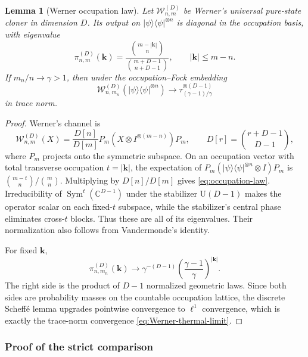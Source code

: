 \documentclass[11pt]{article}
\newtheorem{lemma}[lemma]{Lemma}
\theoremstyle{remark}
\theoremstyle{plain}
\newcommand{\C}{\mathbb C}
\newcommand{\U}{\mathrm U}
\newcommand{\proj}[1]{|#1\rangle\!\langle #1|}
\newcommand{\ot}{\otimes}
\begin{document}
\begin{lemma}[Werner occupation law]
\label{lem:Werner-Fock}
Let \(\mathcal W_{n,m}^{(D)}\) be Werner's universal pure-state cloner in
dimension \(D\).  Its output on \(\proj\psi^{\ot n}\) is diagonal in the
occupation basis, with eigenvalue
\begin{equation}\label{eq:occupation-law}
  \pi_{n,m}^{(D)}(\mathbf k)
  =\frac{\binom{m-|\mathbf k|}{n}}
         {\binom{m+D-1}{n+D-1}},
  \qquad |\mathbf k|\le m-n.
\end{equation}
If \(m_n/n\to\gamma>1\), then under the occupation--Fock embedding
\begin{equation}\label{eq:Werner-thermal-limit}
  \mathcal W_{n,m_n}^{(D)}(\proj\psi^{\ot n})
  \longrightarrow
  \tau_{(\gamma-1)/\gamma}^{\ot(D-1)}
\end{equation}
in trace norm.
\end{lemma}

\begin{proof}
Werner's channel \cite{Werner1998} is
\[
  \mathcal W_{n,m}^{(D)}(X)
  =\frac{D[n]}{D[m]}
   P_m(X\ot I^{\ot(m-n)})P_m,
  \qquad
  D[r]=\binom{r+D-1}{D-1},
\]
where \(P_m\) projects onto the symmetric subspace.  On an occupation vector
with total transverse occupation \(t=|\mathbf k|\), the expectation of
\(P_m(\proj\psi^{\ot n}\ot I)P_m\) is
\(\binom{m-t}{n}/\binom mn\).  Multiplying by \(D[n]/D[m]\) gives
\eqref{eq:occupation-law}.  Irreducibility of \(\operatorname{Sym}^t(\C^{D-1})\)
under the stabilizer \(\U(D-1)\) makes the operator scalar on each fixed-\(t\)
subspace, while the stabilizer's central phase eliminates cross-\(t\) blocks.
Thus these are all of its eigenvalues.  Their normalization also follows
from Vandermonde's identity.

For fixed \(\mathbf k\),
\[
  \pi_{n,m_n}^{(D)}(\mathbf k)
  \longrightarrow
  \gamma^{-(D-1)}
  \left(\frac{\gamma-1}{\gamma}\right)^{|\mathbf k|}.
\]
The right side is the product of \(D-1\) normalized geometric laws.  Since
both sides are probability masses on the countable occupation lattice, the
discrete Scheff\'e lemma upgrades pointwise convergence to \(\ell^1\)
convergence, which is exactly the trace-norm convergence
\eqref{eq:Werner-thermal-limit}.
\end{proof}

\subsubsection{Proof of the strict comparison}
\end{document}
